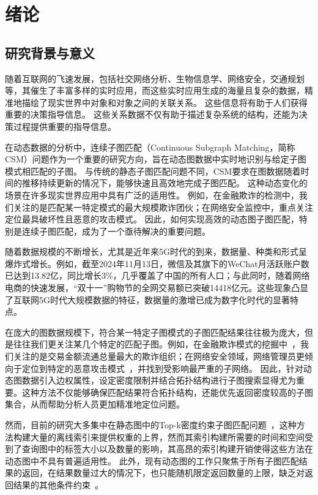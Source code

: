 \chapter{绪论}
\section{研究背景与意义}
随着互联网的飞速发展，包括社交网络分析、生物信息学、网络安全，交通规划等，其催生了丰富多样的实时应用，而这些实时应用生成的海量且复杂的数据，精准地描绘了现实世界中对象和对象之间的关联关系。
这些信息将有助于人们获得重要的决策指导信息。
这些关系数据不仅有助于描述复杂系统的结构，还能为决策过程提供重要的指导信息。


在动态数据的分析中，连续子图匹配（Continuous Subgraph Matching，简称CSM）问题作为一个重要的研究方向，旨在动态图数据中实时地识别与给定子图模式相匹配的子图。
与传统的静态子图匹配问题不同，CSM要求在图数据随着时间的推移持续更新的情况下，能够快速且高效地完成子图匹配。
这种动态变化的场景在许多现实世界应用中具有广泛的适用性。
例如，在金融欺诈的检测中，我们关注的是匹配某一特定模式的最大规模欺诈团伙；在网络安全监控中，重点关注定位最具破坏性且恶意的攻击模式。
因此，如何实现高效的动态图子图匹配，特别是连续子图匹配，成为了一个亟待解决的重要问题。

随着数据规模的不断增长，尤其是近年来5G时代的到来，数据量、种类和形式呈爆炸式增长。例如，截至2024年11月13日，微信及其旗下的WeChat月活跃账户数已达到13.82亿，同比增长3\%，几乎覆盖了中国的所有人口；与此同时，随着网络电商的快速发展，“双十一”购物节的全网交易额已突破14418亿元。这些现象凸显了互联网5G时代大规模数据的特征，数据量的激增已成为数字化时代的显著特点。

在庞大的图数据规模下，符合某一特定子图模式的子图匹配结果往往极为庞大，但是往往我们更关注某几个特定的匹配子图。例如，在金融欺诈模式的挖掘中~\cite{csm-cycle-DBLP:journals/pvldb/QiuCQPZLZ18}，我们关注的是交易金额流通总量最大的欺诈组织；在网络安全领域，网络管理员更倾向于定位到特定的恶意攻击模式~\cite{traffic-graph-matching-DBLP:journals/pvldb/SongGCW14}，并找到受影响最严重的子网络。
因此，针对动态图数据引入边权属性，设定密度限制并结合拓扑结构进行子图搜索显得尤为重要。这种方法不仅能够确保匹配结果符合拓扑结构，还能优先返回密度较高的子图集合，从而帮助分析人员更加精准地定位问题。

然而，目前的研究大多集中在静态图中的Top-k密度约束子图匹配问题~\cite{density-define-DBLP:journals/vldb/AngelKSSST14,dsm-noweight-Bahmani-DBLP:journals/pvldb/BahmaniKV12}，这种方法构建大量的离线索引来提供权重的上界，然而其索引构建所需要的时间和空间受到了查询图中的标签大小以及数量的影响，其高昂的索引构建开销使得这些方法在动态图中不具有普遍适用性。
此外，现有动态图的工作只聚焦于所有子图匹配结果的返回，在结果数量过大的情况下，也只能随机限定返回数量的上限，缺乏对返回结果的其他条件约束~\cite{csm-sjtree-DBLP:conf/edbt/ChoudhuryHCAF15,csm-IncIsoMatch-DBLP:conf/sigmod/FanLLTWW11,dsm-noweight-Hu-DBLP:conf/cikm/HuWC17,csm-turboflux-DBLP:conf/sigmod/KimSHLHCSJ18,csm-graphflowpp-DBLP:journals/tods/MhedhbiKS21,csm-symbi-DBLP:journals/pvldb/MinPPGIH21,csm-rapidflow-DBLP:journals/pvldb/SunSHL22}。

